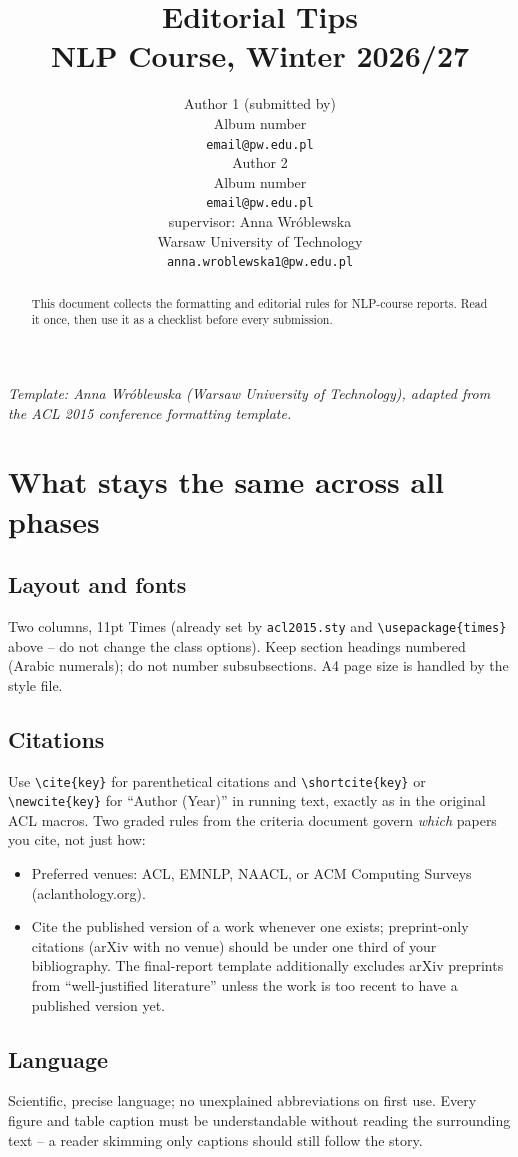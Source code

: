 \documentclass[11pt]{article}
\title{Editorial Tips\\NLP Course, Winter 2026/27}
\author{Author 1 (submitted by) \\
  Album number \\
  {\tt email@pw.edu.pl} \\\And
  Author 2 \\
  Album number \\
  {\tt email@pw.edu.pl} \\ \And
  supervisor: Anna Wróblewska\\
  Warsaw University of Technology \\
  {\tt anna.wroblewska1@pw.edu.pl}}
\date{}
\begin{document}
\maketitle

{\small\em Template: Anna Wr\'oblewska (Warsaw University of Technology), adapted from the ACL 2015 conference formatting template.}
\vspace{4pt}

\begin{abstract}
  This document collects the formatting and editorial rules for NLP-course reports. Read it once, then use it as a checklist before every submission.
\end{abstract}

\section{What stays the same across all phases}

\subsection{Layout and fonts}
Two columns, 11pt Times (already set by \texttt{acl2015.sty} and \texttt{\textbackslash usepackage\{times\}} above -- do not change the class options). Keep section headings numbered (Arabic numerals); do not number subsubsections. A4 page size is handled by the style file.

\subsection{Citations}
Use \verb|\cite{key}| for parenthetical citations and \verb|\shortcite{key}| or \verb|\newcite{key}| for ``Author (Year)'' in running text, exactly as in the original ACL macros. Two graded rules from the criteria document govern \emph{which} papers you cite, not just how:
\begin{itemize}
\item Preferred venues: ACL, EMNLP, NAACL, or ACM Computing Surveys (aclanthology.org).
\item Cite the published version of a work whenever one exists; preprint-only citations (arXiv with no venue) should be under one third of your bibliography. The final-report template additionally excludes arXiv preprints from ``well-justified literature'' unless the work is too recent to have a published version yet.
\end{itemize}

\subsection{Language}
Scientific, precise language; no unexplained abbreviations on first use. Every figure and table caption must be understandable without reading the surrounding text -- a reader skimming only captions should still follow the story.
\end{document}
